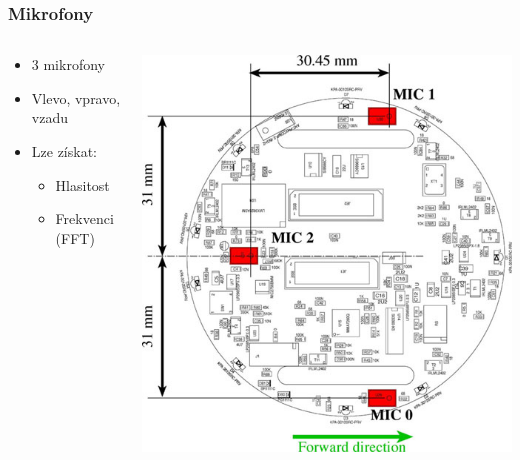 \documentclass{beamer}
\begin{document}
\begin{frame}
    \frametitle{Mikrofony}
    \begin{columns}
        \begin{column}{0.6\textwidth}
            \begin{itemize}
                \item 3 mikrofony
                \item Vlevo, vpravo, vzadu
                \item Lze získat:
                \begin{itemize}
                    \item Hlasitost
                    \item Frekvenci (FFT)
                \end{itemize}
            \end{itemize}
        \end{column}

        \begin{column}{0.4\textwidth}
            \includegraphics[scale=1]{sound.jpg}
        \end{column}
    \end{columns}
\end{frame}
\end{document}
